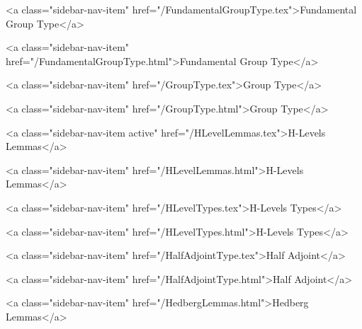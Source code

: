       
        
          <a class="sidebar-nav-item" href="/FundamentalGroupType.tex">Fundamental Group Type</a>
        
      
    
      
        
          <a class="sidebar-nav-item" href="/FundamentalGroupType.html">Fundamental Group Type</a>
        
      
    
      
        
          <a class="sidebar-nav-item" href="/GroupType.tex">Group Type</a>
        
      
    
      
        
          <a class="sidebar-nav-item" href="/GroupType.html">Group Type</a>
        
      
    
      
        
          <a class="sidebar-nav-item active" href="/HLevelLemmas.tex">H-Levels Lemmas</a>
        
      
    
      
        
          <a class="sidebar-nav-item" href="/HLevelLemmas.html">H-Levels Lemmas</a>
        
      
    
      
        
          <a class="sidebar-nav-item" href="/HLevelTypes.tex">H-Levels Types</a>
        
      
    
      
        
          <a class="sidebar-nav-item" href="/HLevelTypes.html">H-Levels Types</a>
        
      
    
      
        
          <a class="sidebar-nav-item" href="/HalfAdjointType.tex">Half Adjoint</a>
        
      
    
      
        
          <a class="sidebar-nav-item" href="/HalfAdjointType.html">Half Adjoint</a>
        
      
    
      
        
          <a class="sidebar-nav-item" href="/HedbergLemmas.html">Hedberg Lemmas</a>
        
